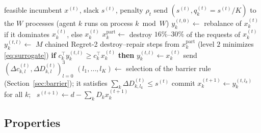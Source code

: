\documentclass[a4paper,fleqn]{cas-sc}
\newcommand{\pcm}{\texttt{PC-MALNS}}
\begin{document}
\begin{algorithm}[!htb]
\caption{Epoch $t$ of \pcm}
\label{alg:epoch}
\small
\begin{algorithmic}[1]
\Require feasible incumbent $x^{(t)}$, slack $s^{(t)}$, penalty $\rho_t$
\State send $(s^{(t)}, q_k^{(t)} = s^{(t)}/K)$ to the $W$ processes (agent $k$ runs on process $k \bmod W$)
    \State $y_k^{(t,0)} \gets$ rebalance of $x_k^{(t)}$ if it dominates $x_k^{(t)}$, else $x_k^{(t)}$
    \State $x_k^{\text{part}} \gets$ destroy $16\%$--$30\%$ of the requests of $x_k^{(t)}$
     
        \State $y_k^{(t,l)} \gets$ $M$ chained Regret-2 destroy--repair steps from $x_k^{\text{part}}$ (level $2$ minimizes \eqref{eq:surrogate})
        \State \textbf{if} $c_k^\top y_k^{(t,l)} \ge c_k^\top x_k^{(t)}$ \textbf{then} $y_k^{(t,l)} \gets x_k^{(t)}$
    \EndFor
    \State send $(\Delta c_{k,l}^{(t)}, \Delta D_{k,l}^{(t)})_{l=0}^{3}$
\EndFor
\State $(l_1,\dots,l_K) \gets$ selection of the barrier rule (Section~\ref{sec:barrier}); it satisfies $\sum_k \Delta D_{k,l_k}^{(t)} \le s^{(t)}$
\State commit $x_k^{(t+1)} \gets y_k^{(t,l_k)}$ for all $k$; \ $s^{(t+1)} \gets d - \sum_k D_k x_k^{(t+1)}$
\end{algorithmic}
\end{algorithm}

\subsection{Properties}
\label{sec:theory}
\end{document}
